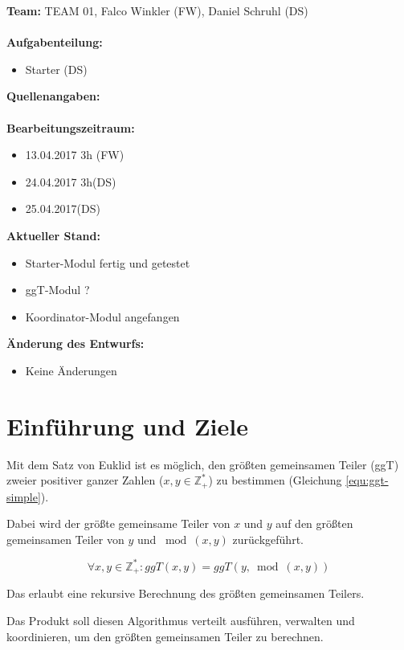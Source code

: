 \documentclass{article}
\begin{document}
\textbf{Team:} TEAM 01, Falco Winkler (FW), Daniel Schruhl (DS)\\
\\
\textbf{Aufgabenteilung:}
\begin{itemize}
    \item Starter (DS)
\end{itemize}

\textbf{Quellenangaben:}\\
\\
\textbf{Bearbeitungszeitraum:}
\begin{itemize}
	\item 13.04.2017 3h (FW)
	\item 24.04.2017 3h(DS)
	\item 25.04.2017(DS)
\end{itemize}

\textbf{Aktueller Stand:}
\begin{itemize}
	\item Starter-Modul fertig und getestet
	\item ggT-Modul ?
	\item Koordinator-Modul angefangen
\end{itemize}

\textbf{Änderung des Entwurfs:}
\begin{itemize}
    \item Keine Änderungen
\end{itemize}

\newpage

\section{Einführung und Ziele}
Mit dem Satz von Euklid ist es möglich, den größten gemeinsamen Teiler (ggT) zweier positiver ganzer Zahlen
($x,y \in \mathbb{Z}^{*}_{+}$) zu bestimmen (Gleichung \ref{equ:ggt-simple}).

Dabei wird der größte gemeinsame Teiler von $x$ und $y$ auf den größten gemeinsamen Teiler von $y$ und $\bmod{(x,y)}$
zurückgeführt.

\begin{equation}
\forall x,y \in \mathbb{Z}^{*}_{+}: ggT(x,y) = ggT(y,\bmod{(x,y)})
\label{equ:ggt-simple}
\end{equation}

Das erlaubt eine rekursive Berechnung des größten gemeinsamen Teilers.

Das Produkt soll diesen Algorithmus verteilt ausführen, verwalten und koordinieren, um den größten gemeinsamen Teiler zu
berechnen.
\end{document}
